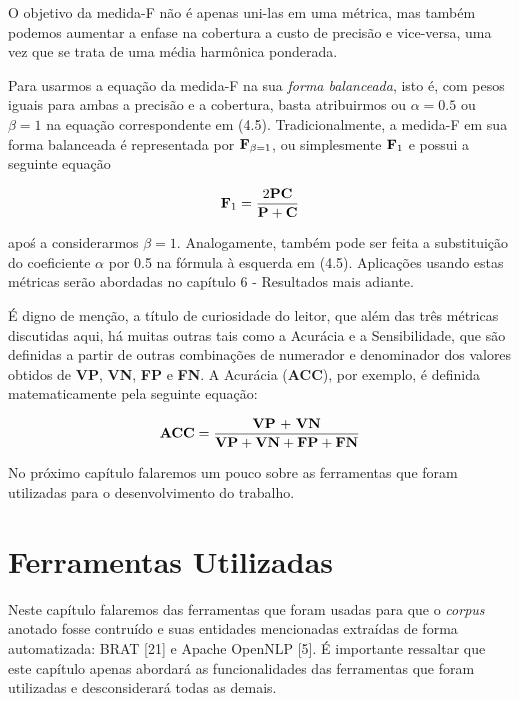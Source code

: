 \documentclass[11pt]{report}
\begin{document}
O objetivo da medida-F não é apenas uni-las em uma métrica, mas também podemos aumentar a enfase na cobertura a custo de precisão e vice-versa, uma vez que se trata de uma média harmônica ponderada.

Para usarmos a equação da medida-F na sua \textit{forma balanceada}, isto é, com pesos iguais para ambas a precisão e a cobertura, basta atribuirmos ou $\alpha = 0.5$ ou  $\beta = 1$ na equação correspondente em (4.5). Tradicionalmente, a medida-F em sua forma balanceada é representada por $\text{\textbf{F}}_{\beta = 1}$, ou simplesmente $\text{\textbf{F}}_{1}$ e possui
a seguinte equação

\begin{equation}
 \text{\textbf{F}}_1 = \dfrac{2\text{\textbf{PC}}}{\text{\textbf{P}} + \text{\textbf{C}}}
\end{equation}

apoś a considerarmos $\beta = 1$. Analogamente, também pode ser feita a substituição do coeficiente $\alpha$ por 0.5 na fórmula à esquerda em (4.5).
Aplicações usando estas métricas serão abordadas no capítulo 6 - Resultados mais adiante.

É digno de menção, a título de curiosidade do leitor, que além das três métricas discutidas aqui, há muitas outras tais como a Acurácia e a Sensibilidade, que são definidas
a partir de outras combinações de numerador e denominador dos valores obtidos de \textbf{VP}, \textbf{VN}, \textbf{FP} e \textbf{FN}. A Acurácia (\textbf{ACC}), por exemplo, é
definida matematicamente pela seguinte equação:

\begin{equation}
 \text{\textbf{ACC}} = \dfrac{\text{\textbf{VP} + \textbf{VN}}}{\text{\textbf{VP}} + \text{\textbf{VN}} + \text{\textbf{FP}} + \text{\textbf{FN}}}
\end{equation}

No próximo capítulo falaremos um pouco sobre as ferramentas que foram utilizadas para o desenvolvimento do trabalho.

\pagebreak
\chapter{Ferramentas Utilizadas}

\indent\indent Neste capítulo falaremos das ferramentas que foram usadas para que o \textit{corpus} anotado fosse contruído e suas entidades mencionadas extraídas
de forma automatizada: BRAT [21] e Apache OpenNLP [5]. É importante ressaltar que este capítulo apenas abordará as funcionalidades das ferramentas que foram utilizadas e desconsiderará todas as
demais.
\end{document}
